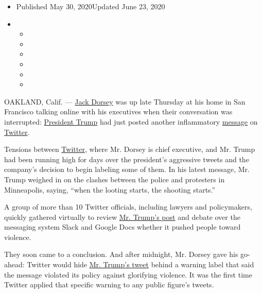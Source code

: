 \begin{itemize}
\item
  Published May 30, 2020Updated June 23, 2020
\item
  \begin{itemize}
  \item
  \item
  \item
  \item
  \item
  \item
  \end{itemize}
\end{itemize}

OAKLAND, Calif. ---
\href{https://www.nytimes3xbfgragh.onion/2020/06/23/technology/trump-twitter-label-seattle.html}{Jack
Dorsey} was up late Thursday at his home in San Francisco talking online
with his executives when their conversation was interrupted:
\href{https://www.nytimes3xbfgragh.onion/2020/06/23/technology/trump-twitter-label-seattle.html}{President
Trump} had just posted another inflammatory
\href{https://twitter.com/realDonaldTrump/status/1266231100780744704}{message}
on
\href{https://www.nytimes3xbfgragh.onion/2020/06/09/us/politics/trump-twitter.html}{Twitter}.

Tensions between
\href{https://www.nytimes3xbfgragh.onion/2020/06/10/technology/trump-twitter-protests.html}{Twitter},
where Mr. Dorsey is chief executive, and Mr. Trump had been running high
for days over the president's aggressive tweets and the company's
decision to begin labeling some of them. In his latest message, Mr.
Trump weighed in on the clashes between the police and protesters in
Minneapolis, saying, ``when the looting starts, the shooting starts.''

A group of more than 10 Twitter officials, including lawyers and
policymakers, quickly gathered virtually to review
\href{https://www.nytimes3xbfgragh.onion/2020/06/03/us/politics/trump-twitter-fact-check.html}{Mr.
Trump's post} and debate over the messaging system Slack and Google Docs
whether it pushed people toward violence.

They soon came to a conclusion. And after midnight, Mr. Dorsey gave his
go-ahead: Twitter would hide
\href{https://www.nytimes3xbfgragh.onion/2020/06/03/us/politics/trump-twitter-fact-check.html}{Mr.
Trump's tweet} behind a warning label that said the message violated its
policy against glorifying violence. It was the first time Twitter
applied that specific warning to any public figure's tweets.

